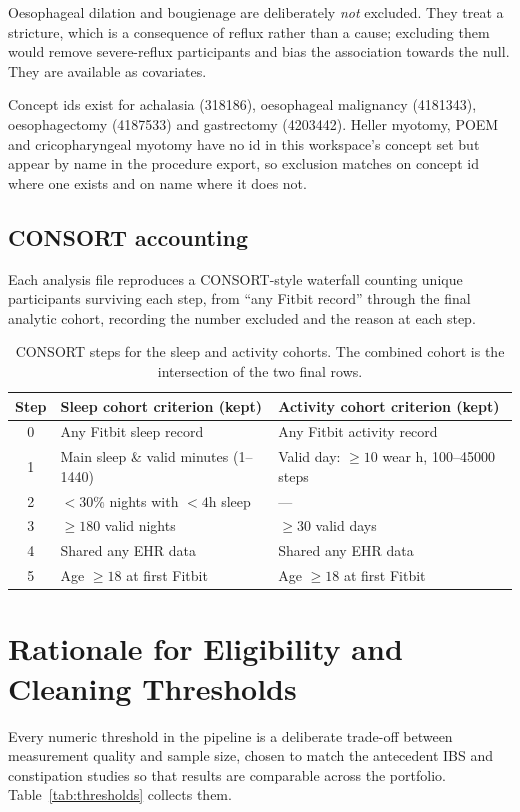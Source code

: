 \documentclass[11pt]{article}
\begin{document}
Oesophageal dilation and bougienage are deliberately \emph{not} excluded. They
treat a stricture, which is a consequence of reflux rather than a cause;
excluding them would remove severe-reflux participants and bias the association
towards the null. They are available as covariates.

Concept ids exist for achalasia (318186), oesophageal malignancy (4181343),
oesophagectomy (4187533) and gastrectomy (4203442). Heller myotomy, POEM and
cricopharyngeal myotomy have no id in this workspace's concept set but appear by
name in the procedure export, so exclusion matches on concept id where one
exists and on name where it does not.

\subsection{CONSORT accounting}
Each analysis file reproduces a CONSORT-style waterfall counting unique participants surviving each
step, from ``any Fitbit record'' through the final analytic cohort, recording the number excluded and
the reason at each step.

\begin{table}[h]
\centering
\footnotesize
\begin{tabular}{@{}c p{5.6cm} p{5.6cm}@{}}
\toprule
\textbf{Step} & \textbf{Sleep cohort criterion (kept)} & \textbf{Activity cohort criterion (kept)} \\
\midrule
0 & Any Fitbit sleep record & Any Fitbit activity record \\
1 & Main sleep \& valid minutes (1--1440) & Valid day: $\geq 10$ wear h, 100--45000 steps \\
2 & $<30\%$ nights with $<4$h sleep & --- \\
3 & $\geq 180$ valid nights & $\geq 30$ valid days \\
4 & Shared any EHR data & Shared any EHR data \\
5 & Age $\geq 18$ at first Fitbit & Age $\geq 18$ at first Fitbit \\
\bottomrule
\end{tabular}
\caption{CONSORT steps for the sleep and activity cohorts. The combined cohort is the intersection of
the two final rows.}
\end{table}

\section{Rationale for Eligibility and Cleaning Thresholds}
Every numeric threshold in the pipeline is a deliberate trade-off between measurement quality and
sample size, chosen to match the antecedent IBS and constipation studies so that results are
comparable across the portfolio. Table~\ref{tab:thresholds} collects them.
\end{document}

